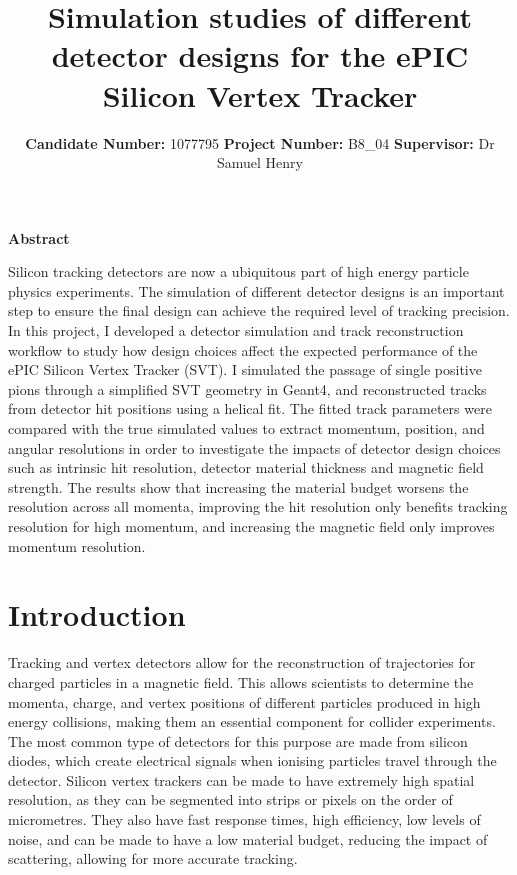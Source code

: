 \documentclass[titlepage]{article}[11pt]
\begin{document}
\begin{titlepage}
	\centering
	
	\title{Simulation studies of different detector designs for the ePIC Silicon Vertex Tracker}

	\author{\parbox{\linewidth}{\centering%
		\textbf{Candidate Number:} 1077795 \endgraf
		\textbf{Project Number:} B8\_04 \endgraf
		\textbf{Supervisor:} Dr Samuel Henry \endgraf
		}}

	\maketitle

\end{titlepage}

\begin{center}
	{\Large \textbf{Abstract}}
\end{center}
\begin{list}{}{
	\leftmargin=1cm  
	\rightmargin=1cm  
}
\item 
Silicon tracking detectors are now a ubiquitous part of high energy particle physics experiments. The simulation of different detector designs is an important step to ensure the final design can achieve the required level of tracking precision. In this project, I developed a detector simulation and track reconstruction workflow to study how design choices affect the expected performance of the ePIC Silicon Vertex Tracker (SVT). I simulated the passage of single positive pions through a simplified SVT geometry in Geant4, and reconstructed tracks from detector hit positions using a helical fit. The fitted track parameters were compared with the true simulated values to extract momentum, position, and angular resolutions in order to investigate the impacts of detector design choices such as intrinsic hit resolution, detector material thickness and magnetic field strength. The results show that increasing the material budget worsens the resolution across all momenta, improving the hit resolution only benefits tracking resolution for high momentum, and increasing the magnetic field only improves momentum resolution.
\end{list}

\section{Introduction} \label{Introduction}
Tracking and vertex detectors allow for the reconstruction of trajectories for charged particles in a magnetic field. This allows scientists to determine the momenta, charge, and vertex positions of different particles produced in high energy collisions, making them an essential component for collider experiments. The most common type of detectors for this purpose are made from silicon diodes, which create electrical signals when ionising particles travel through the detector. Silicon vertex trackers can be made to have extremely high spatial resolution, as they can be segmented into strips or pixels on the order of micrometres. They also have fast response times, high efficiency, low levels of noise, and can be made to have a low material budget, reducing the impact of scattering, allowing for more accurate tracking. 
\end{document}
